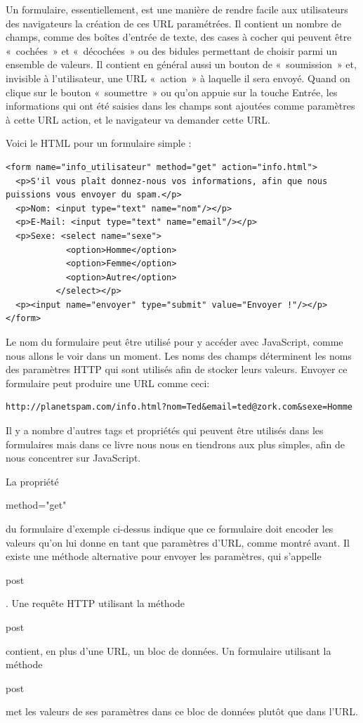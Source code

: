 \documentclass{FramateX}
\renewcommand{\texttt}[1]{\begin{sffamily}{#1}\end{sffamily}}
\begin{document}
Un formulaire, essentiellement, est une manière de rendre facile aux
utilisateurs des navigateurs la création de ces URL paramétrées. Il
contient un nombre de champs, comme des boîtes d'entrée de texte, des
cases à cocher qui peuvent être «~cochées~» et «~décochées~» ou des
bidules permettant de choisir parmi un ensemble de valeurs. Il contient
en général aussi un bouton de «~soumission~» et, invisible à
l'utilisateur, une URL «~action~» à laquelle il sera envoyé. Quand on
clique sur le bouton «~soumettre~» ou qu'on appuie sur la touche Entrée,
les informations qui ont été saisies dans les champs sont ajoutées comme
paramètres à cette URL action, et le navigateur va demander cette URL.

Voici le HTML pour un formulaire simple :

\begin{lstlisting}
<form name="info_utilisateur" method="get" action="info.html">
  <p>S'il vous plaît donnez-nous vos informations, afin que nous puissions vous envoyer du spam.</p>
  <p>Nom: <input type="text" name="nom"/></p>
  <p>E-Mail: <input type="text" name="email"/></p>
  <p>Sexe: <select name="sexe">
            <option>Homme</option>
            <option>Femme</option>
            <option>Autre</option>
          </select></p>
  <p><input name="envoyer" type="submit" value="Envoyer !"/></p>
</form>
\end{lstlisting}
Le nom du formulaire peut être utilisé pour y accéder avec JavaScript,
comme nous allons le voir dans un moment. Les noms des champs
déterminent les noms des paramètres HTTP qui sont utilisés afin de
stocker leurs valeurs. Envoyer ce formulaire peut produire une URL comme
ceci:

\begin{lstlisting}
http://planetspam.com/info.html?nom=Ted&email=ted@zork.com&sexe=Homme
\end{lstlisting}
Il y a nombre d'autres tags et propriétés qui peuvent être utilisés dans
les formulaires mais dans ce livre nous nous en tiendrons aux plus
simples, afin de nous concentrer sur JavaScript.

\begin{center}\end{center}

La propriété \texttt{method="get"} du formulaire d'exemple ci-dessus
indique que ce formulaire doit encoder les valeurs qu'on lui donne en
tant que paramètres d'URL, comme montré avant. Il existe une méthode
alternative pour envoyer les paramètres, qui s'appelle \texttt{post}.
Une requête HTTP utilisant la méthode \texttt{post} contient, en plus
d'une URL, un bloc de données. Un formulaire utilisant la méthode
\texttt{post} met les valeurs de ses paramètres dans ce bloc de données
plutôt que dans l'URL.
\end{document}
